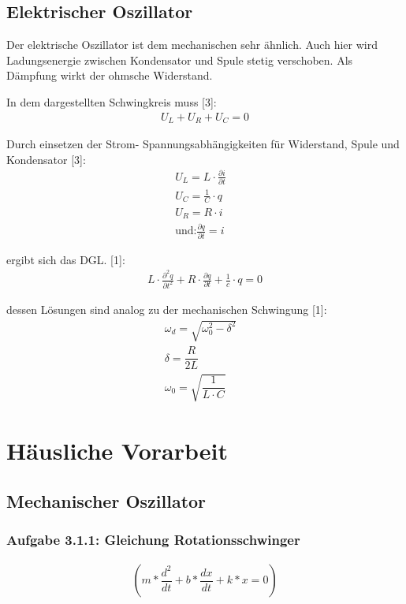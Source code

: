 \documentclass[a4paper]{scrartcl}
\numberwithin{equation}{subsection}
\begin{document}
\subsection{Elektrischer Oszillator}
Der elektrische Oszillator ist dem mechanischen sehr ähnlich. Auch hier wird Ladungsenergie zwischen Kondensator und Spule stetig verschoben. Als Dämpfung wirkt der ohmsche Widerstand. 

In dem dargestellten Schwingkreis muss [3]:
\begin{align}
U_L + U_R + U_C = 0
\end{align}

Durch einsetzen der Strom- Spannungsabhängigkeiten für Widerstand, Spule und Kondensator [3]:
\begin{align}
U_L = L \cdot \frac{\partial i}{\partial t} &\\
U_C = \frac{1}{C} \cdot q &\\
U_R = R \cdot i &\\
\text{und:} \frac{\partial q}{\partial t} = i &
\end{align}

ergibt sich das DGL. [1]:
\begin{align}
L \cdot \frac{\partial^2 q}{\partial t^2} + R \cdot \frac{\partial q}{\partial t} + \frac{1}{c} \cdot q = 0
\end{align}

dessen Lösungen sind analog zu der mechanischen Schwingung [1]:
\begin{align}
\omega_d = \sqrt{\omega_0^2 - \delta^2} &\\
\delta = \dfrac{R}{2L} &\\
\omega_0 = \sqrt{\dfrac{1}{L \cdot C}}
\end{align}

\newpage

\section{Häusliche Vorarbeit}
\subsection{Mechanischer Oszillator}
\subsubsection{Aufgabe 3.1.1: Gleichung Rotationsschwinger}

\begin{align}
(m*\dfrac{d^2}{dt} + b*\dfrac{dx}{dt} + k*x = 0)
\end{align}
\end{document}
